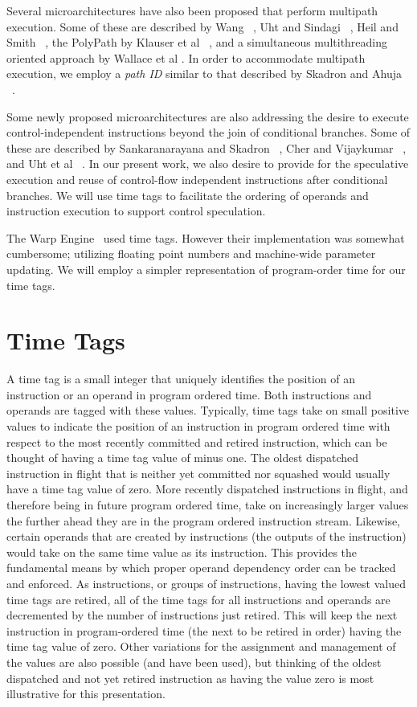 \documentclass[10pt,twocolumn]{article}
\begin{document}
Several microarchitectures have also been proposed that perform multipath
execution.  Some of these are described by Wang ~\cite{Wang90}, 
Uht and Sindagi ~\cite{Uht95},
Heil and Smith ~\cite{Heil96},
the PolyPath by Klauser et al ~\cite{Klauser98},
and a simultaneous multithreading oriented approach by
Wallace et al \cite{Wallace98}. 
In order to accommodate multipath execution, we 
employ a \textit{path ID} similar to that described by Skadron
and Ahuja ~\cite{Skadron01}.

Some newly proposed microarchitectures are also addressing
the desire to execute control-independent instructions
beyond the join of conditional branches.
Some of these are described by 
Sankaranarayana and Skadron ~\cite{Sank01a,Sank01b}, Cher and
Vijaykumar ~\cite{Cher01}, and Uht et al ~\cite{Uht01}.
In our present work, we also desire to provide for the speculative
execution and reuse of control-flow independent instructions
after conditional branches.  We will use time tags
to facilitate the ordering of operands and instruction execution to
support control speculation.

The Warp Engine~\cite{Cleary95} used time tags.  
However their implementation
was somewhat cumbersome; utilizing 
floating point numbers and machine-wide parameter
updating.  
We will employ a simpler representation of program-order time for our time
tags.
%
%
\vspace{-0.25in}
\section{Time Tags}
\vspace{-0.15in}
%
A time tag is a small
integer that uniquely identifies the position of an instruction
or an operand in program ordered time.
Both instructions and operands are tagged with these values.
Typically, time tags take on small positive values to
indicate the position of an instruction in program ordered
time with respect to the most recently committed and retired
instruction, which can be thought of having a time tag value
of minus one.
The oldest dispatched instruction in flight that is neither 
yet committed nor
squashed would usually have a time tag value of zero.
More recently dispatched instructions in flight, and therefore being
in future program
ordered time, take on increasingly larger values the further ahead
they are in the program ordered instruction stream.
Likewise, certain operands that are created by instructions 
(the outputs of the instruction) would take on
the same time value as its instruction.  
This provides
the fundamental means by which proper operand dependency order can
be tracked and enforced.
As instructions, or groups of instructions,
having the lowest valued time tags
are retired, all of the time tags for all instructions and
operands are decremented by the number of instructions just
retired.  
This will keep the next instruction in program-ordered
time (the next to be retired in order)
having the time tag value of zero.
Other variations for the assignment and management of the
values are also possible (and have been used), but thinking 
of the oldest dispatched
and not yet retired instruction as having the value zero is
most illustrative for this presentation.
\end{document}
